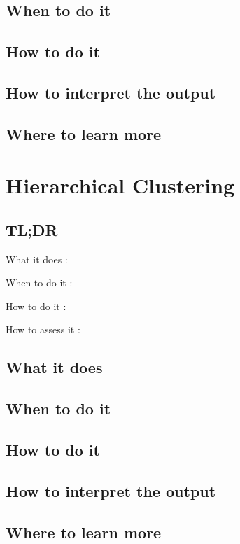 \documentclass[
]{book}
\begin{document}
\hypertarget{when-to-do-it-22}{%
\section{When to do it}\label{when-to-do-it-22}}

\hypertarget{how-to-do-it-22}{%
\section{How to do it}\label{how-to-do-it-22}}

\hypertarget{how-to-interpret-the-output-22}{%
\section{How to interpret the output}\label{how-to-interpret-the-output-22}}

\hypertarget{where-to-learn-more-22}{%
\section{Where to learn more}\label{where-to-learn-more-22}}

\hypertarget{hierarchical-clustering}{%
\chapter{Hierarchical Clustering}\label{hierarchical-clustering}}

\hypertarget{tldr-23}{%
\section{TL;DR}\label{tldr-23}}

What it does
:

When to do it
:

How to do it
:

How to assess it
:

\hypertarget{what-it-does-23}{%
\section{What it does}\label{what-it-does-23}}

\hypertarget{when-to-do-it-23}{%
\section{When to do it}\label{when-to-do-it-23}}

\hypertarget{how-to-do-it-23}{%
\section{How to do it}\label{how-to-do-it-23}}

\hypertarget{how-to-interpret-the-output-23}{%
\section{How to interpret the output}\label{how-to-interpret-the-output-23}}

\hypertarget{where-to-learn-more-23}{%
\section{Where to learn more}\label{where-to-learn-more-23}}

  
\end{document}
